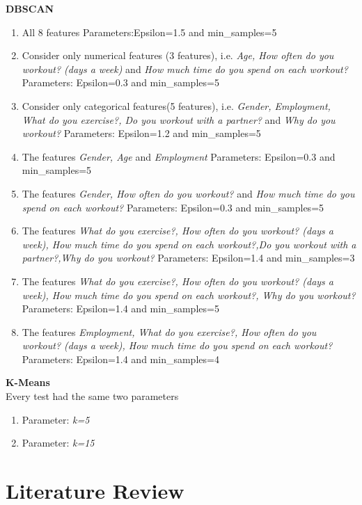 \documentclass[a4paper]{article}
\begin{document}
\textbf{DBSCAN}
\begin{enumerate}
\item All 8 features
\subitem Parameters:Epsilon=1.5 and min\_samples=5
\item Consider only numerical features (3 features), i.e. \textit{Age, How often do you workout? (days a week)} and \textit{How much time do you spend on each workout?}
\subitem Parameters: Epsilon=0.3 and min\_samples=5  
\item Consider only categorical features(5 features), i.e. 
\textit{Gender, Employment, What do you exercise?, Do you workout with a partner?} and \textit{Why do you workout?}
\subitem Parameters: Epsilon=1.2 and min\_samples=5 
\item The features \textit{Gender, Age} and \textit{Employment}
\subitem Parameters: Epsilon=0.3 and min\_samples=5  
\item The features \textit{Gender, How often do you workout?} and \textit{How much time do you spend on each workout?}
\subitem Parameters: Epsilon=0.3 and min\_samples=5  

\item The features \textit{What do you exercise?, How often do you workout? (days a week), How much time do you spend on each workout?,Do you workout with a partner?,Why do you workout?}
\subitem Parameters: Epsilon=1.4 and min\_samples=3
\item The features \textit{What do you exercise?, How often do you workout? (days a week), How much time do you spend on each workout?, Why do you workout?}
\subitem Parameters: Epsilon=1.4 and min\_samples=5
\item The features \textit{Employment, What do you exercise?, How often do you workout? (days a week), How much time do you spend on each workout?}
\subitem Parameters: Epsilon=1.4 and min\_samples=4
\end{enumerate}

\textbf{K-Means}\newline\\
Every test had the same two parameters
\begin{enumerate}
\item Parameter: \textit{k=5}
\item Parameter: \textit{k=15}
\end{enumerate}

\newpage
\section{Literature Review}
\label{literature}
\end{document}
